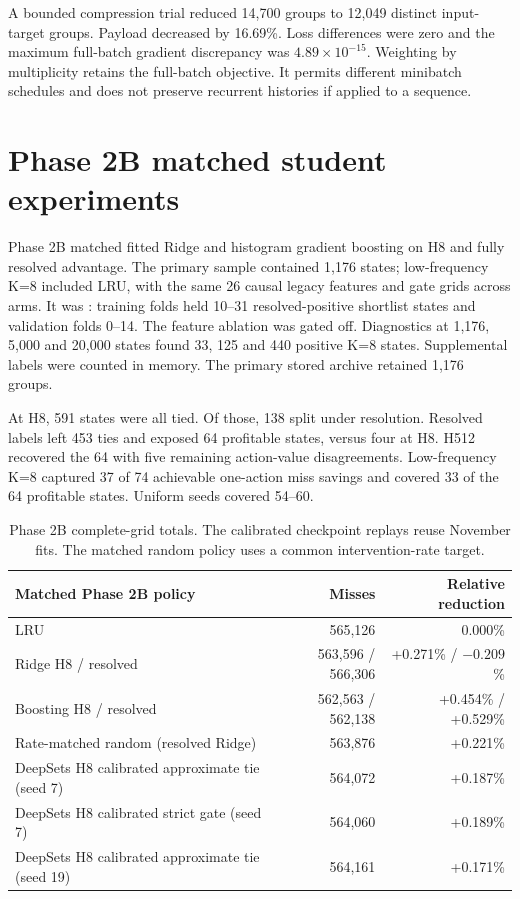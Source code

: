 \documentclass[11pt,letterpaper]{article}
\newcommand{\code}[1]{\texttt{\detokenize{#1}}}
\begin{document}
A bounded compression trial reduced 14,700 groups to 12,049 distinct input-target groups. Payload decreased by 16.69\%. Loss differences were zero and the maximum full-batch gradient discrepancy was \(4.89\times10^{-15}\). Weighting by multiplicity retains the full-batch objective. It permits different minibatch schedules and does not preserve recurrent histories if applied to a sequence.

\section{Phase 2B matched student experiments}
Phase 2B matched fitted Ridge and histogram gradient boosting on H8 and fully resolved advantage. The primary sample contained 1,176 states; low-frequency K=8 included LRU, with the same 26 causal legacy features and gate grids across arms. It was \code{DATA_LIMITED}: training folds held 10--31 resolved-positive shortlist states and validation folds 0--14. The feature ablation was gated off. Diagnostics at 1,176, 5,000 and 20,000 states found 33, 125 and 440 positive K=8 states. Supplemental labels were counted in memory. The primary stored archive retained 1,176 groups.

At H8, 591 states were all tied. Of those, 138 split under resolution. Resolved labels left 453 ties and exposed 64 profitable states, versus four at H8. H512 recovered the 64 with five remaining action-value disagreements. Low-frequency K=8 captured 37 of 74 achievable one-action miss savings and covered 33 of the 64 profitable states. Uniform seeds covered 54--60.

\begin{table}[ht]
\centering
\begin{tabular}{@{}lrr@{}}
\toprule
Matched Phase 2B policy & Misses & Relative reduction \\ \midrule
LRU & 565,126 & 0.000\% \\
Ridge H8 / resolved & 563,596 / 566,306 & +0.271\% / $-0.209$\% \\
Boosting H8 / resolved & 562,563 / 562,138 & +0.454\% / +0.529\% \\
Rate-matched random (resolved Ridge) & 563,876 & +0.221\% \\
DeepSets H8 calibrated approximate tie (seed 7) & 564,072 & +0.187\% \\
DeepSets H8 calibrated strict gate (seed 7) & 564,060 & +0.189\% \\
DeepSets H8 calibrated approximate tie (seed 19) & 564,161 & +0.171\% \\
\bottomrule
\end{tabular}
\caption{Phase 2B complete-grid totals. The calibrated checkpoint replays reuse November fits. The matched random policy uses a common intervention-rate target.}
\label{tab:phase2b}
\end{table}
\end{document}
